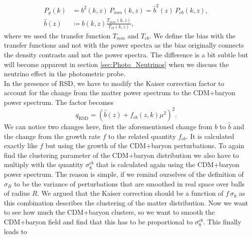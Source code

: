 \documentclass[../main.tex]{subfiles}
\begin{document}
\begin{align}
    P_g(k) &= b^2(k,z)\, P_{mm}(k,z) = \hat{b}^2(z)\, P_{cb}(k,z),\\
    \hat{b}(z) &\coloneq b(k,z) \frac{T_{mm}(k,z)}{T_{cb}(k,z)} \nonumber,
\end{align}
where we used the transfer function $T_{mm}$ and $T_{cb}$. We define the bias with the transfer functions and not with the power spectra as the bias originally connects the density contrasts and not the power spectra. The difference is a bit subtle but will become apparent in section \ref{sec:Photo_Neutrinos} when we discuss the neutrino effect in the photometric probe.\\
In the presence of RSD, we have to modify the Kaiser correction factor to account for the change from the matter power spectrum to the CDM+baryon power spectrum. The factor becomes \begin{equation}
    q_\mathrm{RSD} = \left(\hat{b}(z)+f_{cb}(z,k)\mu^2\right)^2.
\end{equation}
We can notice two changes here, first the aforementioned change from $b$ to $\hat{b}$ and the change from the growth rate $f$ to the related quantity $f_{cb}$. It is calculated exactly like $f$ but using the growth of the CDM+baryon perturbations. To again find the clustering parameter of the CDM+baryon distribution we also have to multiply with the quantity $\sigma_8^{cb}$ that is calculated again using the CDM+baryon power spectrum. The reason is simple, if we remind ourselves of the definition of $\sigma_R$ to be the variance of perturbations that are smoothed in real space over balls of radius $R$. We argued that the Kaiser correction should be a function of $f\,\sigma_8$ as this combination describes the clustering of the matter distribution. Now we want to see how much the CDM+baryon clusters, so we want to smooth the CDM+baryon field and find that this has to be proportional to $\sigma_8^{cb}$. This finally leads to 
\end{document}
